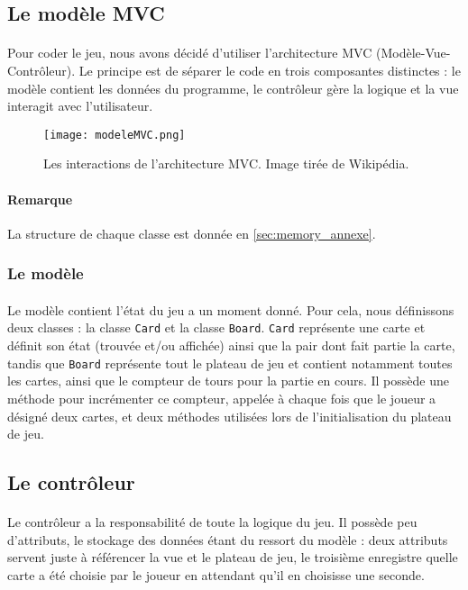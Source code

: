 \subsection{Le modèle MVC}

\paragraph{}Pour coder le jeu, nous avons décidé d'utiliser l'architecture MVC (Modèle-Vue-Contrôleur). Le principe est de séparer le code en trois composantes distinctes : le modèle contient les données du programme, le contrôleur gère la logique et la vue interagit avec l'utilisateur.

\begin{figure}[H]
	\centering
	\texttt{[image: modeleMVC.png]}
	\caption{Les interactions de l'architecture MVC. Image tirée de Wikipédia.}
	\label{fig:MVC}
\end{figure}

\paragraph{\textbf{Remarque}} La structure de chaque classe est donnée en \autoref{sec:memory_annexe}.
\subsubsection{Le modèle}

\paragraph{}Le modèle contient l'état du jeu a un moment donné. Pour cela, nous définissons deux classes : la classe \lstinline|Card| et la classe \lstinline|Board|. \lstinline|Card| représente une carte et définit son état (trouvée et/ou affichée) ainsi que la pair dont fait partie la carte, tandis que \lstinline|Board| représente tout le plateau de jeu et contient notamment toutes les cartes, ainsi que le compteur de tours pour la partie en cours. Il possède une méthode pour incrémenter ce compteur, appelée à chaque fois que le joueur a désigné deux cartes, et deux méthodes utilisées lors de l'initialisation du plateau de jeu.


\subsection{Le contrôleur}

\paragraph{}Le contrôleur a la responsabilité de toute la logique du jeu. Il possède peu d'attributs, le stockage des données étant du ressort du modèle : deux attributs servent juste à référencer la vue et le plateau de jeu, le troisième enregistre quelle carte a été choisie par le joueur en attendant qu'il en choisisse une seconde. 

